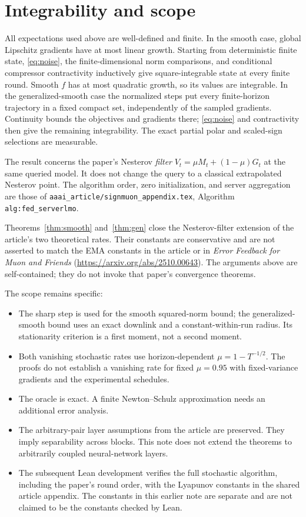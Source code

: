 \documentclass[11pt]{article}
\begin{document}
\section{Integrability and scope}

All expectations used above are well-defined and finite. In the smooth
case, global Lipschitz gradients have at most linear growth. Starting
from deterministic finite state, \eqref{eq:noise}, the finite-dimensional
norm comparisons, and conditional compressor contractivity inductively
give square-integrable state at every finite round. Smooth $f$ has at
most quadratic growth, so its values are integrable. In the
generalized-smooth case the normalized steps put every finite-horizon
trajectory in a fixed compact set, independently of the sampled
gradients. Continuity bounds the objectives and gradients there;
\eqref{eq:noise} and contractivity then give the remaining integrability.
The exact partial polar and scaled-sign selections are measurable.

The result concerns the paper's Nesterov \emph{filter}
$V_t=\mu M_t+(1-\mu)G_t$ at the same queried model. It does not change
the query to a classical extrapolated Nesterov point. The algorithm
order, zero initialization, and server aggregation are those of
\texttt{aaai\_article/signmuon\_appendix.tex}, Algorithm
\texttt{alg:fed\_serverlmo}.

Theorems~\ref{thm:smooth} and~\ref{thm:gen} close the Nesterov-filter
extension of the article's two theoretical rates. Their constants are
conservative and are not asserted to match the EMA constants in the
article or in \emph{Error Feedback for Muon and Friends}
(\url{https://arxiv.org/abs/2510.00643}). The arguments above are
self-contained; they do not invoke that paper's convergence theorems.

The scope remains specific:
\begin{itemize}
\item The sharp step is used for the smooth squared-norm bound; the
generalized-smooth bound uses an exact downlink and a constant-within-run
radius. Its stationarity criterion is a first moment, not a second moment.
\item Both vanishing stochastic rates use horizon-dependent
$\mu=1-T^{-1/2}$. The proofs do not establish a vanishing rate for fixed
$\mu=0.95$ with fixed-variance gradients and the experimental schedules.
\item The oracle is exact. A finite Newton--Schulz approximation needs
an additional error analysis.
\item The arbitrary-pair layer assumptions from the article are
preserved. They imply separability across blocks. This note does not
extend the theorems to arbitrarily coupled neural-network layers.
\item The subsequent Lean development verifies the full stochastic algorithm,
including the paper's round order, with the Lyapunov constants in the shared
article appendix. The constants in this earlier note are separate and are
not claimed to be the constants checked by Lean.
\end{itemize}
\end{document}
